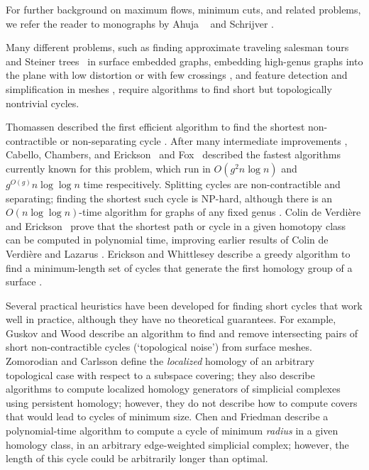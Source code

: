 For further background on maximum flows, minimum cuts, and related problems, we refer the reader to monographs by Ahuja \etal\ \cite{amo-nftaa-93} and Schrijver \cite{s-cape-03}.

Many different problems, such as finding approximate traveling salesman tours  \cite{dhm-aacd-07} and Steiner trees~\cite{bdt-ptass-08} in surface embedded graphs, embedding high-genus graphs into the plane with low distortion \cite{is-pebgg-07} or with few crossings \cite{kr-ccnlt-07}, and feature detection and simplification in meshes \cite{gw-tnr-01,dlsc-cgaht-08}, require algorithms to find short but topologically nontrivial cycles.

Thomassen described the first efficient algorithm to find the shortest non-contractible or non-separating cycle \cite{t-egnsn-90, mt-gs-01}.  After many intermediate improvements \cite{c-mdpg-06, cm-fsnsn-07, eh-ocsd-04, k-csnco-06,cc-msspg-07,insw-iamcmf-11}, Cabello, Chambers, and Erickson~\cite{cce-msspe-13} and Fox~\cite{f-sntcd-13} described the fastest algorithms currently known for this problem, which run in $O(g^2 n \log n)$ and $g^{O(g)} n \log \log n$ time respecitively.
Splitting cycles are non-contractible and separating; finding the shortest such cycle is {NP}-hard, although there is an $O(n \log \log n)$-time algorithm for graphs of any fixed genus \cite{ccelw-scsih-06, ccelw-scsih-08,insw-iamcmf-11}.  Colin de Verdi\`ere and Erickson~\cite{ce-tspcs-06} prove that the shortest path or cycle in a given homotopy class can be computed in polynomial time, improving earlier results of Colin de Verdi\`ere and Lazarus \cite{c-rcds-03, cl-oslos-05, cl-opdsh-07}.  Erickson and Whittlesey describe a greedy algorithm to find a minimum-length set of cycles that generate the first homology group of a surface \cite{ew-gohhg-05}.

Several practical heuristics have been developed for finding short cycles that work well in practice, although they have no theoretical guarantees.  For example, Guskov and Wood \cite{gw-tnr-01} describe an algorithm to find and remove intersecting pairs of short non-contractible cycles (`topological noise') from surface meshes.  Zomorodian and Carlsson \cite{zc-lh-07} define the \emph{localized} homology of an arbitrary topological case with respect to a subspace covering; they also describe algorithms to compute localized homology generators of simplicial complexes using persistent homology; however, they do not describe how to compute covers that would lead to cycles of minimum size.  Chen and Friedman \cite{cf-qhc2-07, cf-qhc-08} describe a polynomial-time algorithm to compute a cycle of minimum \emph{radius} in a given homology class, in an arbitrary edge-weighted simplicial complex; however, the length of this cycle could be arbitrarily longer than optimal.

